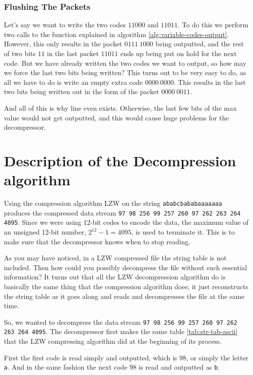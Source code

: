 \begin{refsection}
\subsubsection{Flushing The Packets}

Let's say we want to write the two codes $11000$ and $11011$. To do
this we perform two calls to the function explained in algorithm
\ref{alg:variable-codes-output}. However, this only results in the
packet $0111 \ 1000$ being outputted, and the rest of two bits $11$ in
the last packet $11011$ ends up being put on hold for the next
code. But we have already written the two codes we want to output, so
how may we force the last two bits being written?  This turns out to
be very easy to do, as all we have to do is write an empty extra code
$0000 \ 0000$. This results in the last two bits being written out in
the form of the packet $0000 \ 0011$.

And all of this is why line 
even exists. Otherwise, the last few bits of the max value would not
get outputted, and this would cause huge problems for the
decompressor.

\section{Description of the Decompression algorithm}

Using the compression algorithm LZW on the string
\texttt{ababcbababaaaaaaa} produces the compressed data stream
\texttt{97 98 256 99 257 260 97 262 263 264 4095}. Since we were using
12-bit codes to encode the data, the maximum value of an unsigned
12-bit number, $2^{12} - 1 = 4095$, is used to terminate it. This is to
make sure that the decompressor knows when to stop reading.

As you may have noticed, in a LZW compressed file the string table is
not included. Then how could you possibly decompress the file without
such essential information? It turns out that all the LZW
decompression algorithm do is basically the same thing that the
compression algorithm does; it just reconstructs the string table as
it goes along and reads and decompresses the file at the same time.

So, we wanted to decompress the data stream \texttt{97 98 256 99 257
  260 97 262 263 264 4095}. The decompressor first makes the same
table \ref{tab:str-tab-ascii}  that the LZW compressing algorithm did at the beginning of
its process.

First the first code is read simply and outputted, which is $98$, or
simply the letter \texttt{a}. And in the same fashion the next code
$98$ is read and outputted as \texttt{b}.


\end{refsection}
